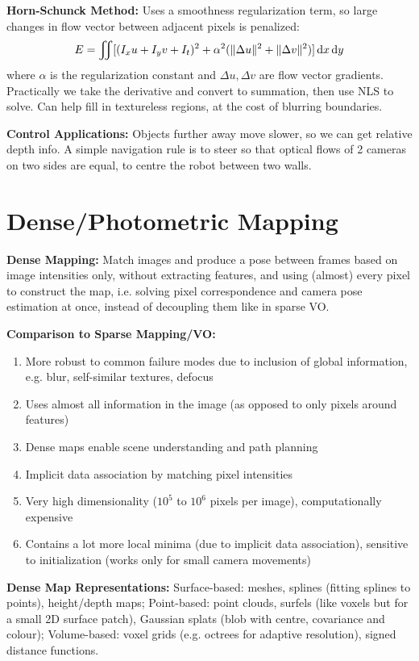 \documentclass[twocolumn, 10pt]{extarticle}
\begin{document}
\textbf{Horn-Schunck Method:} Uses a smoothness regularization term, so large changes in flow vector between adjacent
pixels is penalized:
\[E = \iint [(I_xu + I_yv + I_t)^2 + \alpha^2(\lVert\Delta u\rVert^2 + \lVert\Delta v\rVert^2)]\,\mathrm{d}x\,\mathrm{d}y\]
where \(\alpha\) is the regularization constant and \(\Delta u, \Delta v\) are flow vector gradients.
Practically we take the derivative and convert to summation, then use NLS to solve.
Can help fill in textureless regions, at the cost of blurring boundaries.

\textbf{Control Applications:} Objects further away move slower, so we can get relative depth info. A simple navigation
rule is to steer so that optical flows of 2 cameras on two sides are equal, to centre the robot between two walls.

\section{Dense/Photometric Mapping} %

\textbf{Dense Mapping:} Match images and produce a pose between frames based on image intensities only, without
extracting features, and using (almost) every pixel to construct the map, i.e. solving pixel correspondence and camera
pose estimation at once, instead of decoupling them like in sparse VO.

\textbf{Comparison to Sparse Mapping/VO:}
\begin{enumerate}
    \item More robust to common failure modes due to inclusion of global information, e.g. blur, self-similar textures, defocus
    \item Uses almost all information in the image (as opposed to only pixels around features)
    \item Dense maps enable scene understanding and path planning
    \item Implicit data association by matching pixel intensities
    \item Very high dimensionality ($10^5$ to $10^6$ pixels per image), computationally expensive
    \item Contains a lot more local minima (due to implicit data association), sensitive to initialization (works only for small camera movements)
\end{enumerate}

\textbf{Dense Map Representations:} Surface-based: meshes, splines (fitting splines to points), height/depth maps;
Point-based: point clouds, surfels (like voxels but for a small 2D surface patch), Gaussian splats (blob with centre,
covariance and colour); Volume-based: voxel grids (e.g. octrees for adaptive resolution), signed distance functions.
\end{document}
